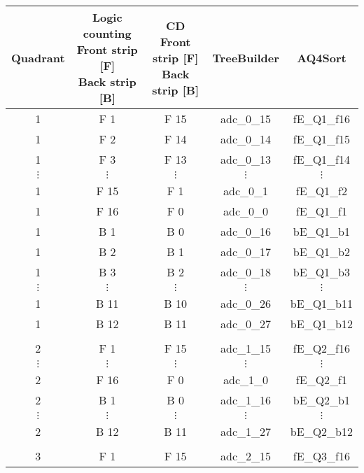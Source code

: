 \begin{tabular}{ccccc}
\hline
Quadrant  & \shortstack{Logic counting \\ Front strip [F] \\ Back strip [B]} & \shortstack{CD \\ Front strip [F] \\ Back strip [B]} & TreeBuilder & AQ4Sort \\
\hline
1         & F 1      & F 15     & adc\_0\_15 & fE\_Q1\_f16 \\
1         & F 2      & F 14     & adc\_0\_14 & fE\_Q1\_f15 \\
1         & F 3      & F 13     & adc\_0\_13 & fE\_Q1\_f14 \\
$\vdots$  & $\vdots$ & $\vdots$ & $\vdots$   & $\vdots$    \\
1         & F 15     & F 1      & adc\_0\_1  & fE\_Q1\_f2  \\
1         & F 16     & F 0      & adc\_0\_0  & fE\_Q1\_f1  \\
1         & B 1      & B 0      & adc\_0\_16 & bE\_Q1\_b1  \\
1         & B 2      & B 1      & adc\_0\_17 & bE\_Q1\_b2  \\
1         & B 3      & B 2      & adc\_0\_18 & bE\_Q1\_b3  \\
$\vdots$  & $\vdots$ & $\vdots$ & $\vdots$   & $\vdots$    \\
1         & B 11     & B 10     & adc\_0\_26 & bE\_Q1\_b11 \\
1         & B 12     & B 11     & adc\_0\_27 & bE\_Q1\_b12 \\
          &          &          &            &             \\
2         & F 1      & F 15     & adc\_1\_15 & fE\_Q2\_f16 \\
$\vdots$  & $\vdots$ & $\vdots$ & $\vdots$   & $\vdots$    \\
2         & F 16     & F 0      & adc\_1\_0  & fE\_Q2\_f1  \\
2         & B 1      & B 0      & adc\_1\_16 & bE\_Q2\_b1  \\
$\vdots$  & $\vdots$ & $\vdots$ & $\vdots$   & $\vdots$    \\
2         & B 12     & B 11     & adc\_1\_27 & bE\_Q2\_b12 \\
          &          &          &            &             \\
3         & F 1      & F 15     & adc\_2\_15 & fE\_Q3\_f16 \\

\end{tabular}
